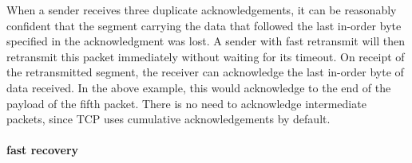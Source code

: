 {\begin{extrainfo}
When a sender receives three duplicate acknowledgements, it can be reasonably confident that the segment carrying the data that followed the last in-order byte specified in the acknowledgment was lost. 
A sender with fast retransmit will then retransmit this packet immediately without waiting for its timeout.
On receipt of the retransmitted segment, the receiver can acknowledge the last in-order byte of data received.
In the above example, this would acknowledge to the end of the payload of the fifth packet.
There is no need to acknowledge intermediate packets, since \acs{TCP} uses cumulative acknowledgements by default.

\paragraph{fast recovery}\leavevmode
\end{extrainfo}
}



